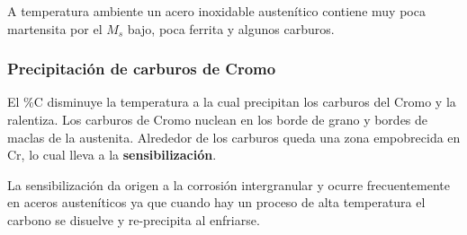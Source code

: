A temperatura ambiente un acero inoxidable austenítico contiene muy poca martensita por el $M_s$ bajo, poca ferrita y algunos carburos.

\subsubsection{Precipitación de carburos de Cromo}
El \%C disminuye la temperatura a la cual precipitan los carburos del Cromo y la ralentiza. Los carburos de Cromo nuclean en los borde de grano y bordes de maclas de la austenita. Alrededor de los carburos queda una zona empobrecida en Cr, lo cual lleva a la \textbf{sensibilización}.

La sensibilización da origen a la corrosión intergranular y ocurre frecuentemente en aceros austeníticos ya que cuando hay un proceso de alta temperatura el carbono se disuelve y re-precipita al enfriarse.
